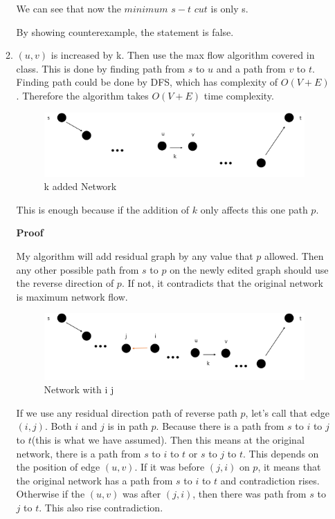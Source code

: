 \documentclass[a4paper,11pt]{article}
\begin{document}
\begin{enumerate}
\begin{enumerate}
	We can see that now the $minimum$ $s-t$ $cut$ is only s.

	By showing counterexample, the statement is false.


	\item
	$(u,v)$ is increased by k. Then use the max flow algorithm covered in class. This is done by finding path from $s$ to $u$ and a path from $v$ to $t$. 
	Finding path could be done by DFS, which has complexity of $O(V+E)$. Therefore the algorithm takes $O(V+E)$ time complexity.
		\begin{figure}[hbt]
		\centering
		\includegraphics[scale=0.4]{figure3.png}
		\caption{k added Network}
		\end{figure}

	This is enough because if the addition of $k$ only affects this one path $p$.
	
	{\bf Proof}

	My algorithm will add residual graph by any value that $p$ allowed. Then any other possible path from $s$ to $p$ on the newly edited graph should use the reverse direction of $p$. If not, it contradicts that the original network is maximum network flow.
		\begin{figure}[hbt]
		\centering
		\includegraphics[scale=0.4]{figure4.png}
		\caption{Network with i j}
	\end{figure}
	If we use any residual direction path of reverse path $p$, let's call that edge $(i, j)$. Both $i$ and $j$ is in path $p$. Because there is a path from $s$ to $i$ to $j$ to $t$(this is what we have assumed). Then this means at the original network, there is a path from $s$ to $i$ to $t$ or $s$ to $j$ to $t$. This depends on the position of edge $(u,v)$. If it was before $(j,i)$ on $p$, it means that the original network has a path from $s$ to $i$ to $t$ and contradiction rises. Otherwise if the $(u,v)$ was after $(j,i)$, then there was path from $s$ to $j$ to $t$. This also rise contradiction.


\end{enumerate}
\end{enumerate}
\end{document}
